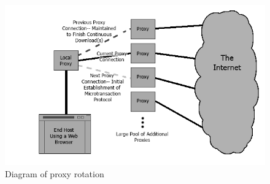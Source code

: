\begin{figure}
  \centering
  \includegraphics[width=1.05\textwidth]{proxydiagram.png}
  \caption{Diagram of proxy rotation}
  \label{fig:proxy-diagram}
\end{figure}

